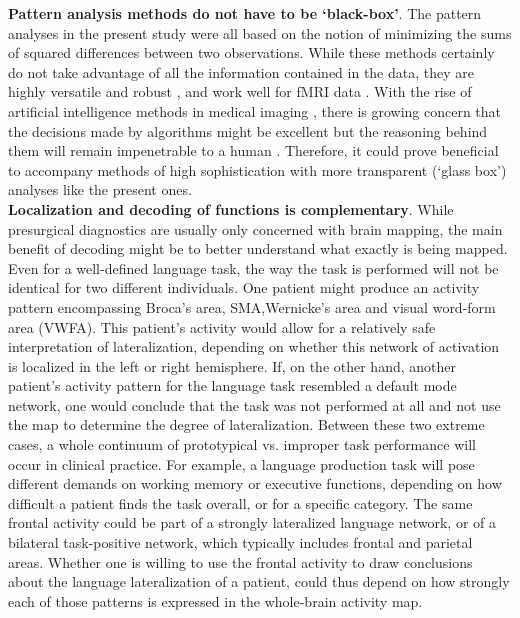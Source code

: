 \documentclass[fleqn,10pt]{SelfArx} %
\begin{document}
\textbf{Pattern analysis methods do not have to be ‘black-box’}. The pattern analyses in the present study were all based on the notion of minimizing the sums of squared differences between two observations. While these methods certainly do not take advantage of all the information contained in the data, they are highly versatile and robust \citep{Hilborn_1997}, and work well for fMRI data \citep{Haxby_2001}. With the rise of artificial intelligence methods in medical imaging \citep{Esteva_2017}, there is growing concern that the decisions made by algorithms might be excellent but the reasoning behind them will remain impenetrable to a human \citep{Castelvecchi_2016}. Therefore, it could prove beneficial to accompany methods of high sophistication with more transparent (‘glass box’) analyses like the present ones.\\
\textbf{Localization and decoding of functions is complementary}. While presurgical diagnostics are usually only concerned with brain mapping, the main benefit of decoding might be to better understand what exactly is being mapped. Even for a well-defined language task, the way the task is performed will not be identical for two different individuals. One patient might produce an activity pattern encompassing Broca's area, SMA,Wernicke's area and visual word-form area (VWFA). This patient's activity would allow for a relatively safe interpretation of lateralization, depending on whether this network of activation is localized in the left or right hemisphere. If, on the other hand, another patient's activity pattern for the language task resembled a default mode network, one would conclude that the task was not performed at all and not use the map to determine the degree of lateralization. Between these two extreme cases, a whole continuum of prototypical vs. improper task performance will occur in clinical practice. For example, a language production task will pose different demands on working memory or executive functions, depending on how difficult a patient finds the task overall, or for a specific category. The same frontal activity could be part of a strongly lateralized language network, or of a bilateral task-positive network, which typically includes frontal and parietal areas. Whether one is willing to use the frontal activity to draw conclusions about the language lateralization of a patient, could thus depend on how strongly each of those patterns is expressed in the whole-brain activity map.
\end{document}
